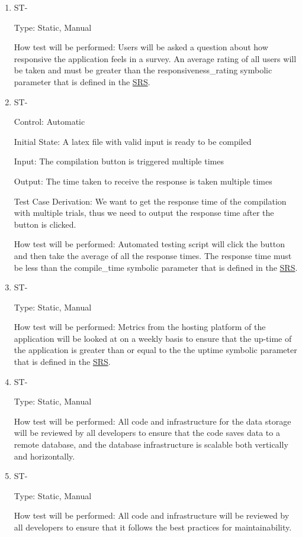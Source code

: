 \documentclass[12pt, titlepage]{article}
\newcounter{TESTID}
\newcommand\TESTNUM{\stepcounter{TESTID}\theTESTID}
\begin{document}
	\begin{enumerate}
		
		\item{ST-\TESTNUM\\}
		
		Type: Static, Manual
		
		How test will be performed: Users will be asked a question about how responsive the application feels in a survey. An average rating of all users will be taken and must be greater than the responsiveness\_rating symbolic parameter that is defined in the \href{https://github.com/RutheniumVI/UnderTree/blob/main/docs/SRS/SRS.pdf}{SRS}.
		
		\item{ST-\TESTNUM\\}
		
		Control: Automatic
		
		Initial State: A latex file with valid input is ready to be compiled 
		
		Input: The compilation button is triggered multiple times
		
		Output: The time taken to receive the response is taken multiple times
		
		Test Case Derivation: We want to get the response time of the compilation with multiple trials, thus we need to output the response time after the button is clicked.
		
		How test will be performed: Automated testing script will click the button and then take the average of all the response times. The response time must be less than the compile\_time symbolic parameter that is defined in the \href{https://github.com/RutheniumVI/UnderTree/blob/main/docs/SRS/SRS.pdf}{SRS}.
		
		\item{ST-\TESTNUM\\}
		
		Type: Static, Manual
		
		How test will be performed: Metrics from the hosting platform of the application will be looked at on a weekly basis to ensure that the up-time of the application is greater than or equal to the the uptime symbolic parameter that is defined in the \href{https://github.com/RutheniumVI/UnderTree/blob/main/docs/SRS/SRS.pdf}{SRS}.
		
		\item{ST-\TESTNUM\\}
		
		Type: Static, Manual
		
		How test will be performed: All code and infrastructure for the data storage will be reviewed by all developers to ensure that the code saves data to a remote database, and the database infrastructure is scalable both vertically and horizontally.
		
		\item{ST-\TESTNUM\\}
		
		Type: Static, Manual
		
		How test will be performed: All code and infrastructure will be reviewed by all developers to ensure that it follows the best practices for maintainability.
		
	\end{enumerate}
\end{document}
